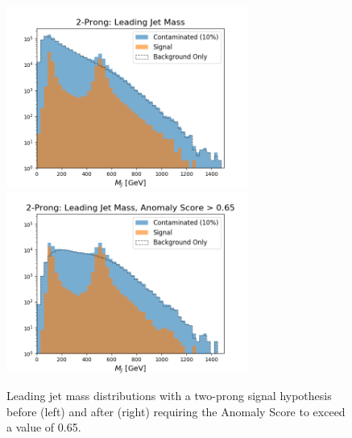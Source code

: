 \documentclass[12pt, a4paper]{article}
\begin{document}
\begin{figure}[H]
	\begin{center}
		\includegraphics[width=225pt]{imgs/bugfix/2Prong_Contaminated_10p0_J_Mass_Multi_Lead_SaveForPaper.png}
		\includegraphics[width=225pt]{imgs/bugfix/2Prong_Contaminated_10p0_J_Mass_AnomScore0p65_Multi_Lead_SaveForPaper.png}
	\end{center}
	\caption{Leading jet mass distributions with a two-prong signal hypothesis before (left) and after (right) requiring the Anomaly Score to exceed a value of 0.65.}
	\label{fig:2P_lj_mass}
\end{figure}
\end{document}
